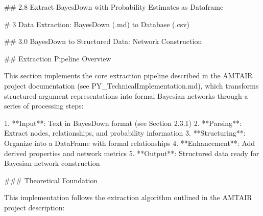 \documentclass[
  11pt,
  letterpaper,
]{book}
\newenvironment{Shaded}{\begin{snugshade}}{\end{snugshade}}
\newcommand{\ErrorTok}[1]{\textcolor[rgb]{0.68,0.00,0.00}{#1}}
\begin{document}
\begin{Shaded}
\begin{Highlighting}[]
\ErrorTok{\#\#} \ErrorTok{2.8} \ErrorTok{Extract} \ErrorTok{BayesDown} \ErrorTok{with} \ErrorTok{Probability} \ErrorTok{Estimates} \ErrorTok{as} \ErrorTok{Dataframe}

\ErrorTok{\#} \ErrorTok{3} \ErrorTok{Data} \ErrorTok{Extraction:} \ErrorTok{BayesDown} \ErrorTok{(.md)} \ErrorTok{to} \ErrorTok{Database} \ErrorTok{(.csv)}

\ErrorTok{\#\#} \ErrorTok{3.0} \ErrorTok{BayesDown} \ErrorTok{to} \ErrorTok{Structured} \ErrorTok{Data:} \ErrorTok{Network} \ErrorTok{Construction}

\ErrorTok{\#\#} \ErrorTok{Extraction} \ErrorTok{Pipeline} \ErrorTok{Overview}

\ErrorTok{This} \ErrorTok{section} \ErrorTok{implements} \ErrorTok{the} \ErrorTok{core} \ErrorTok{extraction} \ErrorTok{pipeline} \ErrorTok{described} \ErrorTok{in} \ErrorTok{the} \ErrorTok{AMTAIR} \ErrorTok{project} \ErrorTok{documentation} \ErrorTok{(see} \ErrorTok{\textasciigrave{}PY\_TechnicalImplementation.md\textasciigrave{}),} \ErrorTok{which} \ErrorTok{transforms} \ErrorTok{structured} \ErrorTok{argument} \ErrorTok{representations} \ErrorTok{into} \ErrorTok{formal} \ErrorTok{Bayesian} \ErrorTok{networks} \ErrorTok{through} \ErrorTok{a} \ErrorTok{series} \ErrorTok{of} \ErrorTok{processing} \ErrorTok{steps:}

\ErrorTok{1.} \ErrorTok{**Input**:} \ErrorTok{Text} \ErrorTok{in} \ErrorTok{BayesDown} \ErrorTok{format} \ErrorTok{(see} \ErrorTok{Section} \ErrorTok{2.3.1)}
\ErrorTok{2.} \ErrorTok{**Parsing**:} \ErrorTok{Extract} \ErrorTok{nodes,} \ErrorTok{relationships,} \ErrorTok{and} \ErrorTok{probability} \ErrorTok{information}
\ErrorTok{3.} \ErrorTok{**Structuring**:} \ErrorTok{Organize} \ErrorTok{into} \ErrorTok{a} \ErrorTok{DataFrame} \ErrorTok{with} \ErrorTok{formal} \ErrorTok{relationships}
\ErrorTok{4.} \ErrorTok{**Enhancement**:} \ErrorTok{Add} \ErrorTok{derived} \ErrorTok{properties} \ErrorTok{and} \ErrorTok{network} \ErrorTok{metrics}
\ErrorTok{5.} \ErrorTok{**Output**:} \ErrorTok{Structured} \ErrorTok{data} \ErrorTok{ready} \ErrorTok{for} \ErrorTok{Bayesian} \ErrorTok{network} \ErrorTok{construction}

\ErrorTok{\#\#\#} \ErrorTok{Theoretical} \ErrorTok{Foundation}

\ErrorTok{This} \ErrorTok{implementation} \ErrorTok{follows} \ErrorTok{the} \ErrorTok{extraction} \ErrorTok{algorithm} \ErrorTok{outlined} \ErrorTok{in} \ErrorTok{the} \ErrorTok{AMTAIR} \ErrorTok{project} \ErrorTok{description:}


\end{Highlighting}
\end{Shaded}
\end{document}
